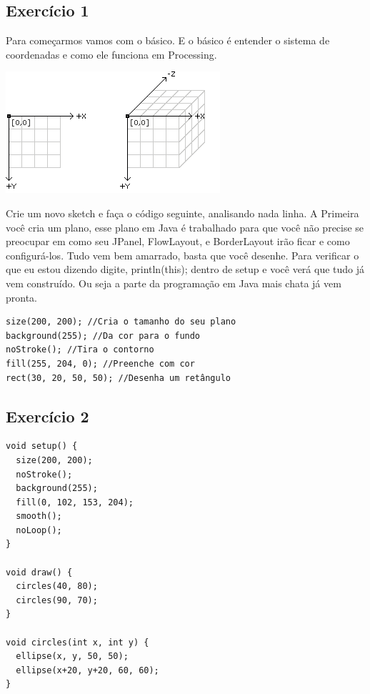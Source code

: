 \documentclass[12pt]{article}
\begin{document}
\subsection{Exercício 1}

\qquad Para começarmos vamos com o básico. E o básico é entender o sistema de coordenadas e como ele funciona em Processing.

\begin{center}
\includegraphics[scale=0.7]{coordinates}
\end{center}

\qquad Crie um novo sketch e faça o código seguinte, analisando nada linha. A Primeira você cria um plano, esse plano em Java é trabalhado para que você não precise se preocupar em como seu JPanel, FlowLayout, e BorderLayout irão ficar e como configurá-los. Tudo vem bem amarrado, basta que você desenhe. Para verificar o que eu estou dizendo digite, println(this); dentro de setup e você verá que tudo já vem construído. Ou seja a parte da programação em Java mais chata já vem pronta.

\begin{verbatim}
size(200, 200); //Cria o tamanho do seu plano
background(255); //Da cor para o fundo
noStroke(); //Tira o contorno
fill(255, 204, 0); //Preenche com cor
rect(30, 20, 50, 50); //Desenha um retângulo
\end{verbatim}

\subsection{Exercício 2}

\qquad \begin{verbatim}
void setup() {
  size(200, 200);
  noStroke();
  background(255);
  fill(0, 102, 153, 204);
  smooth();
  noLoop();
}

void draw() {
  circles(40, 80);
  circles(90, 70);
}

void circles(int x, int y) {
  ellipse(x, y, 50, 50);
  ellipse(x+20, y+20, 60, 60);
}
\end{verbatim}
\end{document}
